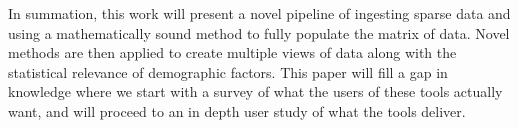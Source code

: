 In summation, this work will present a novel pipeline of ingesting sparse data and using a mathematically sound method to fully populate the matrix of data. Novel methods are then applied to create multiple views of data along with the statistical relevance of demographic factors. This paper will fill a gap in knowledge where we start with a survey of what the users of these tools actually want, and will proceed to an in depth user study of what the tools deliver.
